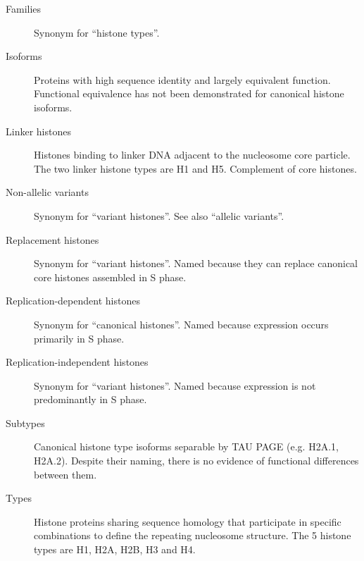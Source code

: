 {\begin{shaded}
\begin{description}
        \item[Families] \hfill \newline
        Synonym for ``histone types''.

        \item[Isoforms] \hfill \newline
        Proteins with high sequence identity and largely equivalent function.
        Functional equivalence has not been demonstrated for canonical histone isoforms.

        \item[Linker histones] \hfill \newline
        Histones binding to linker DNA adjacent to the nucleosome core particle.
        The two linker histone types are H1 and H5. Complement of core histones.

        \item[Non-allelic variants] \hfill \newline
        Synonym for ``variant histones''. See also ``allelic variants''.

        \item[Replacement histones] \hfill \newline
        Synonym for ``variant histones''.
        Named because they can replace canonical core histones assembled in S phase.

        \item[Replication-dependent histones] \hfill \newline
        Synonym for ``canonical histones''.
        Named because expression occurs primarily in S phase.

        \item[Replication-independent histones] \hfill \newline
        Synonym for ``variant histones''.
        Named because expression is not predominantly in S phase.

        \item[Subtypes] \hfill \newline
        Canonical histone type isoforms separable by TAU PAGE
        (e.g. H2A.1, H2A.2).  Despite their naming, there is no evidence of
        functional differences between them.

        \item[Types] \hfill \newline
        Histone proteins sharing sequence homology
        that participate in specific combinations to define the repeating nucleosome structure.
        The 5 histone types are H1, H2A, H2B, H3 and H4.


\end{description}
\end{shaded}}
